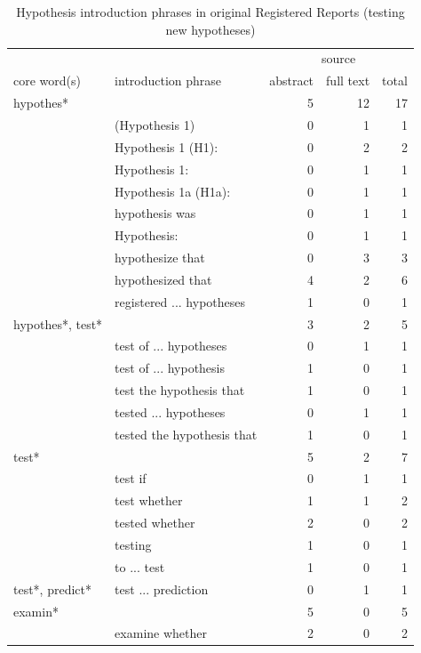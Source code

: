 \documentclass[british,,man,floatsintext]{apa6}
\begin{document}
\begin{table}[tbp]

\begin{center}
\begin{threeparttable}

\caption{\label{tab:unnamed-chunk-6}Hypothesis introduction phrases in original Registered Reports (testing new hypotheses)}

\footnotesize{

\begin{tabular}{llrrr}
\toprule
 &  & \multicolumn{3}{c}{source} \\
\cmidrule(r){3-5}
core word(s) & introduction phrase & abstract & full text & total\\
\midrule
hypothes* &  & 5 & 12 & 17\\
 & (Hypothesis 1) & 0 & 1 & 1\\
 & Hypothesis 1 (H1): & 0 & 2 & 2\\
 & Hypothesis 1: & 0 & 1 & 1\\
 & Hypothesis 1a (H1a): & 0 & 1 & 1\\
 & hypothesis was & 0 & 1 & 1\\
 & Hypothesis: & 0 & 1 & 1\\
 & hypothesize that & 0 & 3 & 3\\
 & hypothesized that & 4 & 2 & 6\\
 & registered ... hypotheses & 1 & 0 & 1\\ \midrule
hypothes*, test* &  & 3 & 2 & 5\\
 & test of ... hypotheses & 0 & 1 & 1\\
 & test of ... hypothesis & 1 & 0 & 1\\
 & test the hypothesis that & 1 & 0 & 1\\
 & tested ... hypotheses & 0 & 1 & 1\\
 & tested the hypothesis that & 1 & 0 & 1\\ \midrule
test* &  & 5 & 2 & 7\\
 & test if & 0 & 1 & 1\\
 & test whether & 1 & 1 & 2\\
 & tested whether & 2 & 0 & 2\\
 & testing & 1 & 0 & 1\\
 & to ... test & 1 & 0 & 1\\ \midrule
test*, predict* & test ... prediction & 0 & 1 & 1\\ \midrule
examin* &  & 5 & 0 & 5\\
 & examine whether & 2 & 0 & 2\\

\end{tabular}}
\end{threeparttable}
\end{center}
\end{table}
\end{document}
